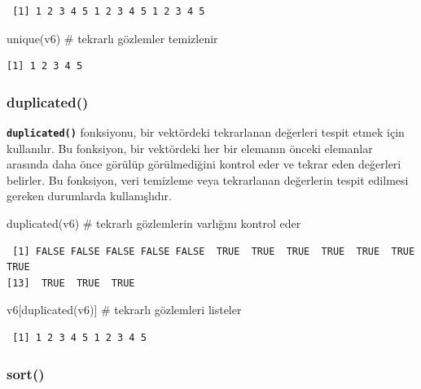 \documentclass[
  letterpaper,
  DIV=11,
  numbers=noendperiod]{scrreprt}
\newenvironment{Shaded}{\begin{snugshade}}{\end{snugshade}}
\newcommand{\CommentTok}[1]{\textcolor[rgb]{0.37,0.37,0.37}{#1}}
\newcommand{\FunctionTok}[1]{\textcolor[rgb]{0.28,0.35,0.67}{#1}}
\newcommand{\NormalTok}[1]{\textcolor[rgb]{0.00,0.23,0.31}{#1}}
\begin{document}
\begin{verbatim}
 [1] 1 2 3 4 5 1 2 3 4 5 1 2 3 4 5
\end{verbatim}

\begin{Shaded}
\begin{Highlighting}[]
\FunctionTok{unique}\NormalTok{(v6) }\CommentTok{\# tekrarlı gözlemler temizlenir}
\end{Highlighting}
\end{Shaded}

\begin{verbatim}
[1] 1 2 3 4 5
\end{verbatim}

\hypertarget{duplicated}{%
\subsubsection{duplicated()}\label{duplicated}}

\textbf{\texttt{duplicated()}} fonksiyonu, bir vektördeki tekrarlanan
değerleri tespit etmek için kullanılır. Bu fonksiyon, bir vektördeki her
bir elemanın önceki elemanlar arasında daha önce görülüp görülmediğini
kontrol eder ve tekrar eden değerleri belirler. Bu fonksiyon, veri
temizleme veya tekrarlanan değerlerin tespit edilmesi gereken durumlarda
kullanışlıdır.

\begin{Shaded}
\begin{Highlighting}[]
\FunctionTok{duplicated}\NormalTok{(v6) }\CommentTok{\# tekrarlı gözlemlerin varlığını kontrol eder}
\end{Highlighting}
\end{Shaded}

\begin{verbatim}
 [1] FALSE FALSE FALSE FALSE FALSE  TRUE  TRUE  TRUE  TRUE  TRUE  TRUE  TRUE
[13]  TRUE  TRUE  TRUE
\end{verbatim}

\begin{Shaded}
\begin{Highlighting}[]
\NormalTok{v6[}\FunctionTok{duplicated}\NormalTok{(v6)] }\CommentTok{\# tekrarlı gözlemleri listeler}
\end{Highlighting}
\end{Shaded}

\begin{verbatim}
 [1] 1 2 3 4 5 1 2 3 4 5
\end{verbatim}

\hypertarget{sort}{%
\subsubsection{sort()}\label{sort}}
\end{document}
